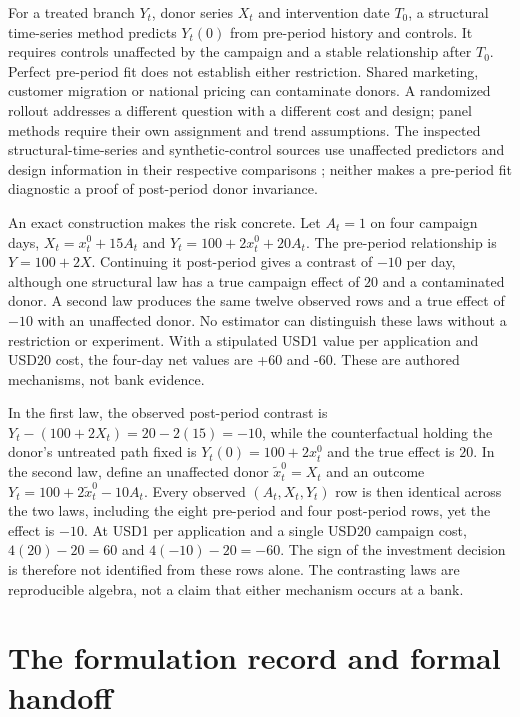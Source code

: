 For a treated branch $Y_t$, donor series $X_t$ and intervention date $T_0$, a structural time-series method predicts $Y_t(0)$ from pre-period history and controls. It requires controls unaffected by the campaign and a stable relationship after $T_0$. Perfect pre-period fit does not establish either restriction. Shared marketing, customer migration or national pricing can contaminate donors. A randomized rollout addresses a different question with a different cost and design; panel methods require their own assignment and trend assumptions.
The inspected structural-time-series and synthetic-control sources use unaffected predictors and design information in their respective comparisons \citep{exec13_ci_brodersen2015,abadie2010}; neither makes a pre-period fit diagnostic a proof of post-period donor invariance.

An exact construction makes the risk concrete. Let $A_t=1$ on four campaign days, $X_t=x_t^0+15A_t$ and $Y_t=100+2x_t^0+20A_t$. The pre-period relationship is $Y=100+2X$. Continuing it post-period gives a contrast of $-10$ per day, although one structural law has a true campaign effect of $20$ and a contaminated donor. A second law produces the same twelve observed rows and a true effect of $-10$ with an unaffected donor. No estimator can distinguish these laws without a restriction or experiment. With a stipulated USD1 value per application and USD20 cost, the four-day net values are +60 and -60. These are authored mechanisms, not bank evidence.

In the first law, the observed post-period contrast is $Y_t-(100+2X_t)=20-2(15)=-10$, while the counterfactual holding the donor's untreated path fixed is $Y_t(0)=100+2x_t^0$ and the true effect is $20$. In the second law, define an unaffected donor $\widetilde x_t^0=X_t$ and an outcome $Y_t=100+2\widetilde x_t^0-10A_t$. Every observed $(A_t,X_t,Y_t)$ row is then identical across the two laws, including the eight pre-period and four post-period rows, yet the effect is $-10$. At USD1 per application and a single USD20 campaign cost, $4(20)-20=60$ and $4(-10)-20=-60$. The sign of the investment decision is therefore not identified from these rows alone. The contrasting laws are reproducible algebra, not a claim that either mechanism occurs at a bank.

\section{The formulation record and formal handoff}

